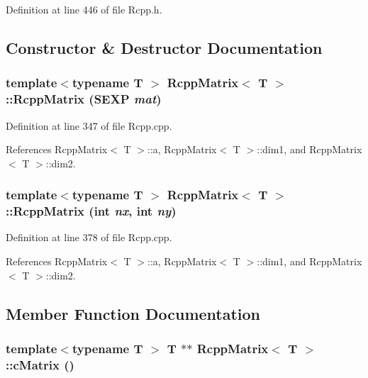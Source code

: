 Definition at line 446 of file Rcpp.h.

\subsection{Constructor \& Destructor Documentation}
\hypertarget{classRcppMatrix_6cdd09180c21b504d1455ae2bc8939a7}{
\subsubsection[{RcppMatrix}]{\setlength{\rightskip}{0pt plus 5cm}template$<$typename T $>$ {\bf RcppMatrix}$<$ T $>$::{\bf RcppMatrix} (SEXP {\em mat})}}
\label{classRcppMatrix_6cdd09180c21b504d1455ae2bc8939a7}




Definition at line 347 of file Rcpp.cpp.

References RcppMatrix$<$ T $>$::a, RcppMatrix$<$ T $>$::dim1, and RcppMatrix$<$ T $>$::dim2.\hypertarget{classRcppMatrix_9ac16e2fcccd2a21a33097139e4ec253}{
\subsubsection[{RcppMatrix}]{\setlength{\rightskip}{0pt plus 5cm}template$<$typename T $>$ {\bf RcppMatrix}$<$ T $>$::{\bf RcppMatrix} (int {\em nx}, \/  int {\em ny})}}
\label{classRcppMatrix_9ac16e2fcccd2a21a33097139e4ec253}




Definition at line 378 of file Rcpp.cpp.

References RcppMatrix$<$ T $>$::a, RcppMatrix$<$ T $>$::dim1, and RcppMatrix$<$ T $>$::dim2.

\subsection{Member Function Documentation}
\hypertarget{classRcppMatrix_e94a95b2125bd594965e26a93c994da4}{
\subsubsection[{cMatrix}]{\setlength{\rightskip}{0pt plus 5cm}template$<$typename T $>$ T $\ast$$\ast$ {\bf RcppMatrix}$<$ T $>$::cMatrix ()}}
\label{classRcppMatrix_e94a95b2125bd594965e26a93c994da4}




